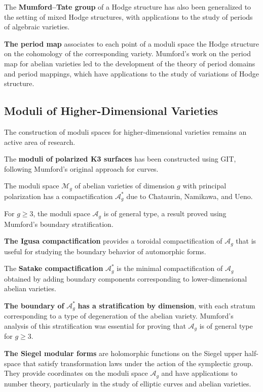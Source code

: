 The \textbf{Mumford--Tate group} of a Hodge structure has also been generalized to the setting of mixed Hodge structures, with applications to the study of periods of algebraic varieties.

\textbf{The period map} associates to each point of a moduli space the Hodge structure on the cohomology of the corresponding variety. Mumford's work on the period map for abelian varieties led to the development of the theory of period domains and period mappings, which have applications to the study of variations of Hodge structure.

\subsection{Moduli of Higher-Dimensional Varieties}

The construction of moduli spaces for higher-dimensional varieties remains an active area of research.

The \textbf{moduli of polarized K3 surfaces} has been constructed using GIT, following Mumford's original approach for curves.

The moduli space $\mathcal{M}_{g}$ of abelian varieties of dimension $g$ with principal polarization has a compactification $\mathcal{A}_g^*$ due to Chataurin, Namikawa, and Ueno.

For $g \geq 3$, the moduli space $\mathcal{A}_g$ is of general type, a result proved using Mumford's boundary stratification.

\textbf{The Igusa compactification} provides a toroidal compactification of $\mathcal{A}_g$ that is useful for studying the boundary behavior of automorphic forms.

The \textbf{Satake compactification} $\mathcal{A}_g^*$ is the minimal compactification of $\mathcal{A}_g$ obtained by adding boundary components corresponding to lower-dimensional abelian varieties.

\textbf{The boundary of }$\mathcal{A}_g^*$ \textbf{has a stratification by dimension}, with each stratum corresponding to a type of degeneration of the abelian variety. Mumford's analysis of this stratification was essential for proving that $\mathcal{A}_g$ is of general type for $g \geq 3$.

\textbf{The Siegel modular forms} are holomorphic functions on the Siegel upper half-space that satisfy transformation laws under the action of the symplectic group. They provide coordinates on the moduli space $\mathcal{A}_g$ and have applications to number theory, particularly in the study of elliptic curves and abelian varieties.

